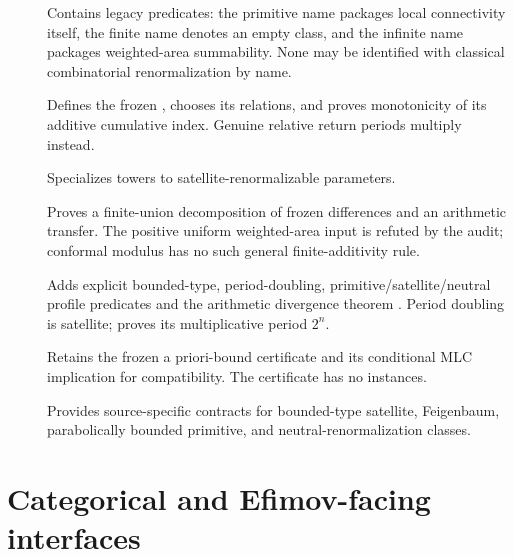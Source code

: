 \begin{description}
\item[]
Contains legacy predicates: the primitive name packages local
connectivity itself, the finite name denotes an empty class, and
the infinite name packages weighted-area summability.  None may
be identified with classical combinatorial renormalization by name.

\item[]
Defines the frozen , chooses its relations,
and proves monotonicity of its additive cumulative index.  Genuine
relative return periods multiply instead.

\item[]
Specializes towers to satellite-renormalizable parameters.

\item[]
Proves a finite-union decomposition of frozen differences and an
arithmetic transfer.  The positive uniform weighted-area input is
refuted by the audit; conformal modulus has no such general
finite-additivity rule.

\item[]
Adds explicit bounded-type, period-doubling, primitive/satellite/neutral
profile predicates and the arithmetic divergence theorem
.  Period doubling is
satellite;  proves its
multiplicative period $2^n$.

\item[]
Retains the frozen a priori-bound certificate and its conditional
MLC implication for compatibility.  The certificate has no instances.

\item[]
Provides source-specific contracts for bounded-type satellite, Feigenbaum,
parabolically bounded primitive, and neutral-renormalization classes.
\end{description}

\section{Categorical and Efimov-facing interfaces}

